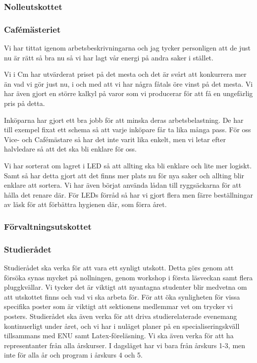 \documentclass[../_main/handlingar.tex]{subfiles}
\begin{document}
\subsubsection*{Nolleutskottet}

\subsubsection*{Cafémästeriet}

Vi har tittat igenom arbetsbeskrivningarna och jag tycker personligen att de just nu är rätt så bra nu så vi har lagt vår energi på andra saker i stället.

Vi i Cm har utvärderat priset på det mesta och det är svårt att konkurrera mer än vad vi gör just nu, i och med att vi har några fåtals öre vinst på det mesta. Vi har även gjort en större kalkyl på varor som vi producerar för att få en ungefärlig pris på detta.

Inköparna har gjort ett bra jobb för att minska deras arbetsbelastning. De har till exempel fixat ett schema så att varje inköpare får ta lika många pass. För oss Vice- och Cafémästare så har det inte varit lika enkelt, men vi letar efter halvledare så att det ska bli enklare för oss.

Vi har sorterat om lagret i LED så att allting ska bli enklare och lite mer logiskt. Samt så har detta gjort att det finns mer plats nu för nya saker och allting blir enklare att sortera. Vi har även börjat använda lådan till ryggsäckarna för att hålla det renare där. För LEDs förråd så har vi gjort flera men färre beställningar av läsk för att förbättra hygienen där, som förra året.

\subsubsection*{Förvaltningsutskottet}

\subsubsection*{Studierådet}

Studierådet ska verka för att vara ett synligt utskott. Detta görs genom att försöka synas mycket på nollningen, genom workshop i första läsveckan samt flera pluggkvällar. Vi tycker det är viktigt att nyantagna studenter blir medvetna om att utskottet finns och vad vi ska arbeta för. För att öka synligheten för vissa specifika poster som är viktigt att sektionens medlemmar vet om trycker vi posters. Studierådet ska även verka för att driva studierelaterade evenemang kontinuerligt under året, och vi har i nuläget planer på en specialiseringskväll tillsammans med ENU samt Latex-föreläsning. Vi ska även verka för att ha representanter från alla årskurser. I dagsläget har vi bara från årskurs 1-3, men inte för alla år och program i årskurs 4 och 5. 
\end{document}
